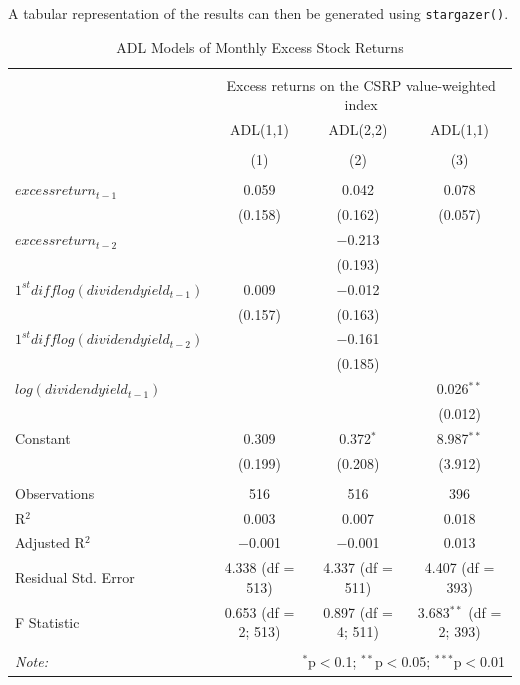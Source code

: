 \documentclass[]{book}
\theoremstyle{definition}
\theoremstyle{definition}
\theoremstyle{definition}
\theoremstyle{remark}
\begin{document}
A tabular representation of the results can then be generated using
\texttt{stargazer()}.

\begin{table} \centering 
  \caption{ADL Models of Monthly Excess Stock Returns} 
  \label{} 
\begin{tabular}{@{\extracolsep{-5pt}}lccc} 
\\[-1.8ex]\hline 
\hline \\[-1.8ex] 
 & \multicolumn{3}{c}{Excess returns on the CSRP value-weighted index} \\ 
\cline{2-4} 
 & ADL(1,1) & ADL(2,2) & ADL(1,1) \\ 
\\[-1.8ex] & (1) & (2) & (3)\\ 
\hline \\[-1.8ex] 
 $excess return_{t-1}$ & 0.059 & 0.042 & 0.078 \\ 
  & (0.158) & (0.162) & (0.057) \\ 
  $excess return_{t-2}$ &  & $-$0.213 &  \\ 
  &  & (0.193) &  \\ 
  $1^{st} diff log(dividend yield_{t-1})$ & 0.009 & $-$0.012 &  \\ 
  & (0.157) & (0.163) &  \\ 
  $1^{st} diff log(dividend yield_{t-2})$ &  & $-$0.161 &  \\ 
  &  & (0.185) &  \\ 
  $log(dividend yield_{t-1})$ &  &  & 0.026$^{**}$ \\ 
  &  &  & (0.012) \\ 
  Constant & 0.309 & 0.372$^{*}$ & 8.987$^{**}$ \\ 
  & (0.199) & (0.208) & (3.912) \\ 
 \hline \\[-1.8ex] 
Observations & 516 & 516 & 396 \\ 
R$^{2}$ & 0.003 & 0.007 & 0.018 \\ 
Adjusted R$^{2}$ & $-$0.001 & $-$0.001 & 0.013 \\ 
Residual Std. Error & 4.338 (df = 513) & 4.337 (df = 511) & 4.407 (df = 393) \\ 
F Statistic & 0.653 (df = 2; 513) & 0.897 (df = 4; 511) & 3.683$^{**}$ (df = 2; 393) \\ 
\hline 
\hline \\[-1.8ex] 
\textit{Note:}  & \multicolumn{3}{r}{$^{*}$p$<$0.1; $^{**}$p$<$0.05; $^{***}$p$<$0.01} \\ 
\end{tabular} 
\end{table}
\end{document}
